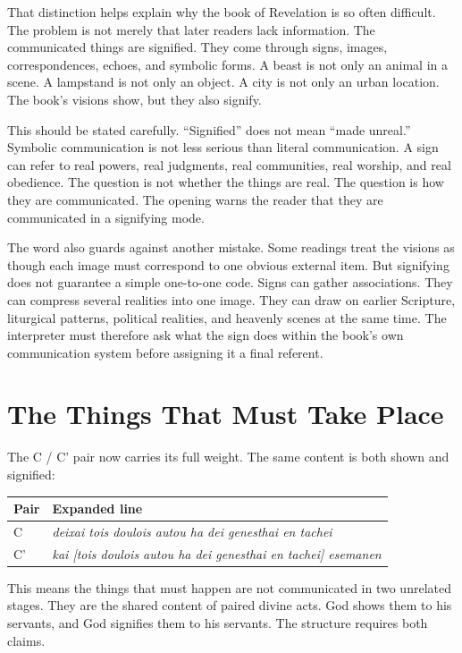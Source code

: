That distinction helps explain why the book of Revelation is so often difficult. The problem is not merely that later readers lack information. The communicated things are signified. They come through signs, images, correspondences, echoes, and symbolic forms. A beast is not only an animal in a scene. A lampstand is not only an object. A city is not only an urban location. The book's visions show, but they also signify.

This should be stated carefully. ``Signified'' does not mean ``made unreal.'' Symbolic communication is not less serious than literal communication. A sign can refer to real powers, real judgments, real communities, real worship, and real obedience. The question is not whether the things are real. The question is how they are communicated. The opening warns the reader that they are communicated in a signifying mode.

The word also guards against another mistake. Some readings treat the visions as though each image must correspond to one obvious external item. But signifying does not guarantee a simple one-to-one code. Signs can gather associations. They can compress several realities into one image. They can draw on earlier Scripture, liturgical patterns, political realities, and heavenly scenes at the same time. The interpreter must therefore ask what the sign does within the book's own communication system before assigning it a final referent.

\section{The Things That Must Take Place}

The C / C' pair now carries its full weight. The same content is both shown and signified:

\begin{center}
\begin{longtable}{@{}p{}p{}@{}}
\toprule
Pair & Expanded line \\
\midrule
C & \textit{deixai tois doulois autou ha dei genesthai en tachei} \\
C' & \textit{kai [tois doulois autou ha dei genesthai en tachei] esemanen} \\
\bottomrule
\end{longtable}
\end{center}

This means the things that must happen are not communicated in two unrelated stages. They are the shared content of paired divine acts. God shows them to his servants, and God signifies them to his servants. The structure requires both claims.

